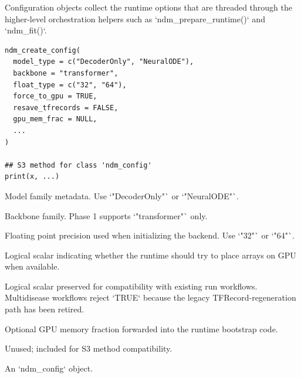 \documentclass[a4paper]{book}
\begin{document}
%
\begin{Examples}
\end{Examples}
%
\begin{Description}
Configuration objects collect the runtime options that are threaded through
the higher-level orchestration helpers such as `ndm\_prepare\_runtime()` and
`ndm\_fit()`.
\end{Description}
%
\begin{Usage}
\begin{verbatim}
ndm_create_config(
  model_type = c("DecoderOnly", "NeuralODE"),
  backbone = "transformer",
  float_type = c("32", "64"),
  force_to_gpu = TRUE,
  resave_tfrecords = FALSE,
  gpu_mem_frac = NULL,
  ...
)

## S3 method for class 'ndm_config'
print(x, ...)
\end{verbatim}
\end{Usage}
%
\begin{Arguments}
\begin{ldescription}
\item[\code{model\_type}] Model family metadata. Use `"DecoderOnly"` or
`"NeuralODE"`.

\item[\code{backbone}] Backbone family. Phase 1 supports `"transformer"` only.

\item[\code{float\_type}] Floating point precision used when initializing the backend.
Use `"32"` or `"64"`.

\item[\code{force\_to\_gpu}] Logical scalar indicating whether the runtime should try
to place arrays on GPU when available.

\item[\code{resave\_tfrecords}] Logical scalar preserved for compatibility with
existing run workflows. Multidisease workflows reject `TRUE` because the
legacy TFRecord-regeneration path has been retired.

\item[\code{gpu\_mem\_frac}] Optional GPU memory fraction forwarded into the runtime
bootstrap code.

\item[\code{...}] Unused; included for S3 method compatibility.

\item[\code{x}] An `ndm\_config` object.
\end{ldescription}
\end{Arguments}
\end{document}
